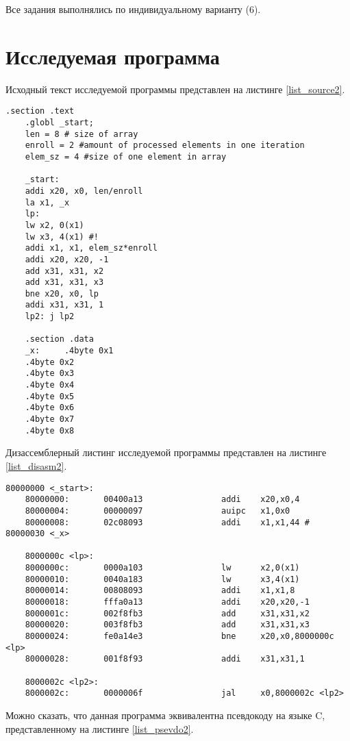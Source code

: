 Все задания выполнялись по индивидуальному варианту (6).

\section*{Исследуемая программа}

Исходный текст исследуемой программы  представлен на листинге \ref{list_source2}.

\begin{lstlisting}[caption=Исходный текст исследуемой программы,
	label={list_source2}]
	.section .text
	.globl _start;
	len = 8 # size of array 
	enroll = 2 #amount of processed elements in one iteration
	elem_sz = 4 #size of one element in array
	
	_start:
	addi x20, x0, len/enroll
	la x1, _x
	lp:
	lw x2, 0(x1)
	lw x3, 4(x1) #!
	addi x1, x1, elem_sz*enroll
	addi x20, x20, -1
	add x31, x31, x2
	add x31, x31, x3
	bne x20, x0, lp
	addi x31, x31, 1
	lp2: j lp2
	
	.section .data
	_x:     .4byte 0x1
	.4byte 0x2
	.4byte 0x3
	.4byte 0x4
	.4byte 0x5
	.4byte 0x6
	.4byte 0x7
	.4byte 0x8
\end{lstlisting}

\clearpage
Дизассемблерный листинг исследуемой программы  представлен на листинге \ref{list_disasm2}.


\begin{lstlisting}[caption=Дизассемблерный листинг исследуемой программы,
	label={list_disasm2}]
	80000000 <_start>:
	80000000:       00400a13                addi    x20,x0,4
	80000004:       00000097                auipc   x1,0x0
	80000008:       02c08093                addi    x1,x1,44 # 80000030 <_x>
	
	8000000c <lp>:
	8000000c:       0000a103                lw      x2,0(x1)
	80000010:       0040a183                lw      x3,4(x1)
	80000014:       00808093                addi    x1,x1,8
	80000018:       fffa0a13                addi    x20,x20,-1
	8000001c:       002f8fb3                add     x31,x31,x2
	80000020:       003f8fb3                add     x31,x31,x3
	80000024:       fe0a14e3                bne     x20,x0,8000000c <lp>
	80000028:       001f8f93                addi    x31,x31,1
	
	8000002c <lp2>:
	8000002c:       0000006f                jal     x0,8000002c <lp2>
\end{lstlisting}

\clearpage
Можно сказать, что данная программа эквивалентна псевдокоду на языке C, представленному на листинге \ref{list_psevdo2}.


